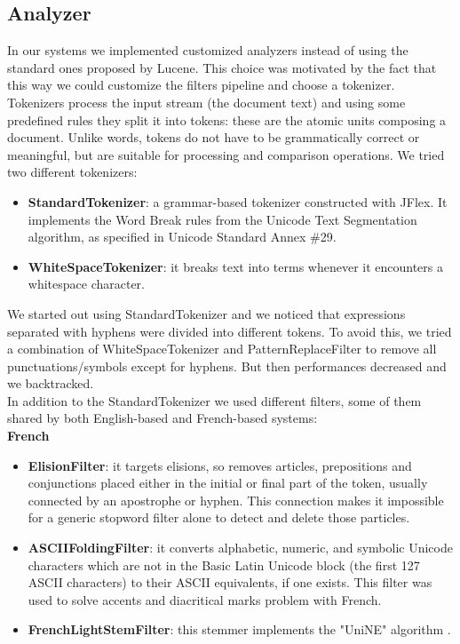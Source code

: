 \subsection{Analyzer}
\label{subsec:analyzer}
In our systems we implemented customized analyzers instead of using the standard ones proposed by Lucene. This choice was motivated by the fact that this way we could customize the filters pipeline and choose a tokenizer. Tokenizers process the input stream (the document text) and using some predefined rules they split it into tokens: these are the atomic units composing a document. Unlike words, tokens do not have to be grammatically correct or meaningful, but are suitable for processing and comparison operations.
We tried two different tokenizers:
\begin{itemize}
    \item \textbf{StandardTokenizer}: a grammar-based tokenizer constructed with JFlex. It implements the Word Break rules from the Unicode Text Segmentation algorithm, as specified in Unicode Standard Annex \#29.
    \item \textbf{WhiteSpaceTokenizer}: it breaks text into terms whenever it encounters a whitespace character.
\end{itemize}
We started out using StandardTokenizer and we noticed that expressions separated with hyphens were divided into different tokens. To avoid this, we tried a combination of WhiteSpaceTokenizer and PatternReplaceFilter to remove all punctuations/symbols except for hyphens. But then performances decreased and we backtracked.
\\
In addition to the StandardTokenizer we used different filters, some of them shared by both English-based and French-based systems:
\\
\textbf{French}
\begin{itemize}
    \item \textbf{ElisionFilter}: it targets elisions, so removes articles, prepositions and conjunctions placed either in the initial or final part of the token, usually connected by an apostrophe or hyphen. This connection makes it impossible for a generic stopword filter alone to detect and delete those particles.
    \item \textbf{ASCIIFoldingFilter}: it converts alphabetic, numeric, and symbolic Unicode characters which are not in the Basic Latin Unicode block (the first 127 ASCII characters) to their ASCII equivalents, if one exists. This filter was used to solve accents and diacritical marks problem with French.
    \item \textbf{FrenchLightStemFilter}: this stemmer implements the "UniNE" algorithm \cite{frenchlightstemmer}.
\end{itemize}
